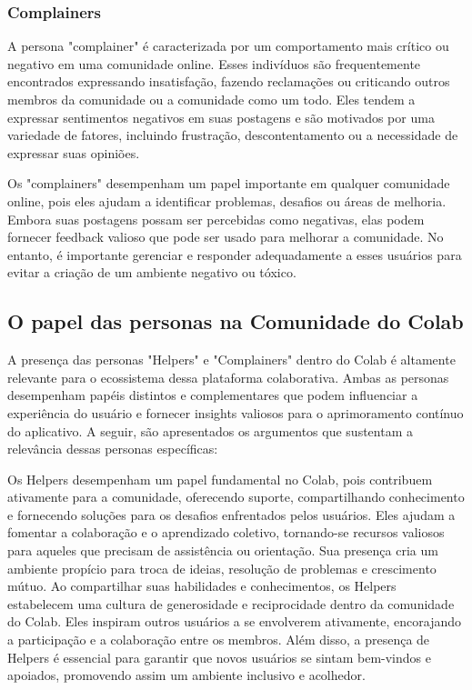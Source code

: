 \subsubsection*{Complainers}

A persona "complainer" é caracterizada por um comportamento mais crítico ou negativo em uma comunidade online. Esses indivíduos são frequentemente encontrados expressando insatisfação, fazendo reclamações ou criticando outros membros da comunidade ou a comunidade como um todo. Eles tendem a expressar sentimentos negativos em suas postagens e são motivados por uma variedade de fatores, incluindo frustração, descontentamento ou a necessidade de expressar suas opiniões.

Os "complainers" desempenham um papel importante em qualquer comunidade online, pois eles ajudam a identificar problemas, desafios ou áreas de melhoria. Embora suas postagens possam ser percebidas como negativas, elas podem fornecer feedback valioso que pode ser usado para melhorar a comunidade. No entanto, é importante gerenciar e responder adequadamente a esses usuários para evitar a criação de um ambiente negativo ou tóxico.

\subsection*{O papel das personas na Comunidade do Colab}

A presença das personas "Helpers" e "Complainers" dentro do Colab é altamente relevante para o ecossistema dessa plataforma colaborativa. Ambas as personas desempenham papéis distintos e complementares que podem influenciar a experiência do usuário e fornecer insights valiosos para o aprimoramento contínuo do aplicativo. A seguir, são apresentados os argumentos que sustentam a relevância dessas personas específicas:

Os Helpers desempenham um papel fundamental no Colab, pois contribuem ativamente para a comunidade, oferecendo suporte, compartilhando conhecimento e fornecendo soluções para os desafios enfrentados pelos usuários. Eles ajudam a fomentar a colaboração e o aprendizado coletivo, tornando-se recursos valiosos para aqueles que precisam de assistência ou orientação. Sua presença cria um ambiente propício para troca de ideias, resolução de problemas e crescimento mútuo. Ao compartilhar suas habilidades e conhecimentos, os Helpers estabelecem uma cultura de generosidade e reciprocidade dentro da comunidade do Colab. Eles inspiram outros usuários a se envolverem ativamente, encorajando a participação e a colaboração entre os membros. Além disso, a presença de Helpers é essencial para garantir que novos usuários se sintam bem-vindos e apoiados, promovendo assim um ambiente inclusivo e acolhedor.

